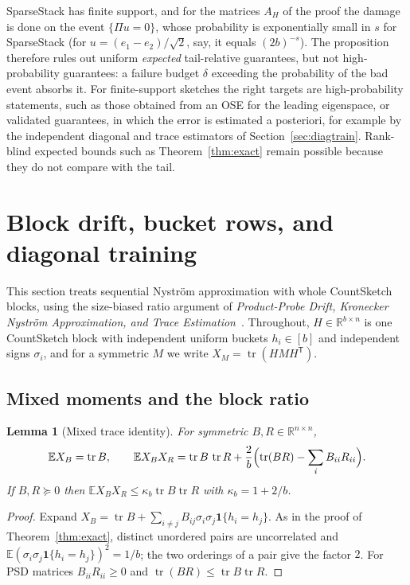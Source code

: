 \documentclass[11pt,a4paper]{article}
\newtheorem{lemma}[theorem]{Lemma}
\theoremstyle{definition}
\theoremstyle{remark}
\newcommand{\E}{\mathbb E}
\newcommand{\R}{\mathbb R}
\newcommand{\tr}{\operatorname{tr}}
\newcommand{\1}{\mathbf 1}
\newcommand{\T}{\mathsf T}
\begin{document}
SparseStack has finite support, and for the matrices $A_H$ of the proof
the damage is done on the event $\{\Pi u=0\}$, whose probability is
exponentially small in $s$ for SparseStack (for $u=(e_1-e_2)/\sqrt2$, say,
it equals $(2b)^{-s}$). The proposition therefore rules out uniform
\emph{expected} tail-relative guarantees, but not high-probability
guarantees: a failure budget $\delta$ exceeding the probability of the
bad event absorbs it. For finite-support sketches the right targets
are high-probability statements, such as those obtained from an OSE for
the leading eigenspace, or validated guarantees, in which the error is
estimated a posteriori, for example by the independent diagonal and
trace estimators of Section~\ref{sec:diagtrain}. Rank-blind expected
bounds such as Theorem~\ref{thm:exact} remain possible because they do
not compare with the tail.

\section{Block drift, bucket rows, and diagonal training}\label{sec:blocks}

This section treats sequential Nystr\"om approximation with whole
CountSketch blocks, using the size-biased ratio argument of
\emph{Product-Probe Drift, Kronecker Nystr\"om Approximation, and Trace
Estimation}~\cite{PPD}. Throughout, $H\in\R^{b\times n}$ is one
CountSketch block with independent uniform buckets $h_i\in[b]$ and
independent signs $\sigma_i$, and for a symmetric $M$ we write
$X_M=\tr(HMH^\T)$.

\subsection{Mixed moments and the block ratio}
\begin{lemma}[Mixed trace identity]\label{lem:mixed}
For symmetric $B,R\in\R^{n\times n}$,
\[
 \E X_B=\tr B,\qquad
 \E X_BX_R=\tr B\,\tr R+\frac2b\Bigl(\tr(BR)-\sum_iB_{ii}R_{ii}\Bigr).
\]
If $B,R\succeq0$ then $\E X_BX_R\le\kappa_b\tr B\tr R$ with
$\kappa_b=1+2/b$.
\end{lemma}
\begin{proof}
Expand $X_B=\tr B+\sum_{i\ne j}B_{ij}\sigma_i\sigma_j\1\{h_i=h_j\}$. As in
the proof of Theorem~\ref{thm:exact}, distinct unordered pairs are
uncorrelated and $\E(\sigma_i\sigma_j\1\{h_i=h_j\})^2=1/b$; the two
orderings of a pair give the factor $2$. For PSD matrices
$B_{ii}R_{ii}\ge0$ and $\tr(BR)\le\tr B\tr R$.
\end{proof}
\end{document}
